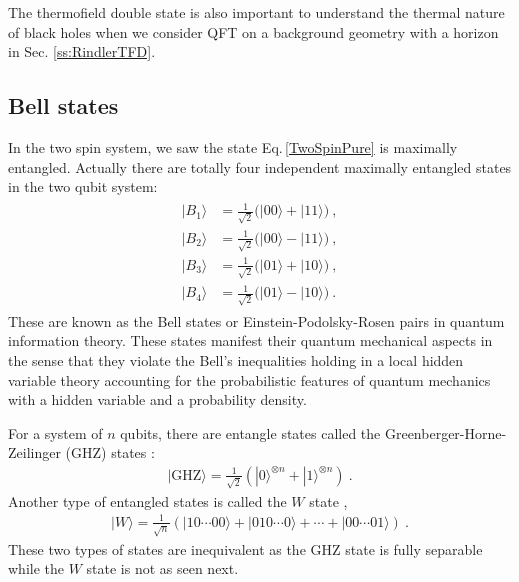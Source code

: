 The thermofield double state is also important to understand the thermal nature of black holes when we consider QFT on a background geometry with a horizon in Sec. \ref{ss:RindlerTFD}.




\subsection{Bell states}
In the two spin system, we saw the state Eq.\,\eqref{TwoSpinPure} is maximally entangled.
Actually there are totally four independent maximally entangled states in the two qubit system:
\begin{align}\label{BellStates}
\begin{aligned}
	|B_1\rangle &= \frac{1}{\sqrt{2}} \Big( |00\rangle + |11\rangle\Big) \ ,\\
	|B_2\rangle &= \frac{1}{\sqrt{2}} \Big(  |00\rangle - |11\rangle\Big) \ ,\\
	|B_3\rangle &= \frac{1}{\sqrt{2}} \Big(  |01\rangle + |10\rangle\Big) \ ,\\
	|B_4\rangle &= \frac{1}{\sqrt{2}} \Big(  |01\rangle - |10\rangle\Big) \ .
\end{aligned}
\end{align}
These are known as the Bell states or Einstein-Podolsky-Rosen pairs in quantum information theory.
These states manifest their quantum mechanical aspects in the sense that they violate the Bell's inequalities holding in a local hidden variable theory accounting for the probabilistic features of quantum mechanics with a hidden variable and a probability density. 


For a system of $n$ qubits, there are entangle states called the Greenberger-Horne-Zeilinger (GHZ) states \cite{greenberger1989going,greenberger1990bell}:
\begin{align}
	|\text{GHZ}\rangle = \frac{1}{\sqrt{2}} \left( |0\rangle^{\otimes n} + |1\rangle^{\otimes n} \right) \ .
\end{align}
Another type of entangled states is called the $W$ state \cite{Dur:2000zz},
\begin{align}
	|W \rangle = \frac{1}{\sqrt{n}} \left( |10\cdots00\rangle +  |010\cdots 0\rangle +\cdots + |00\cdots01\rangle  \right) \ .
\end{align}
These two types of states are inequivalent as the GHZ state is fully separable while the $W$ state is not as seen next.


